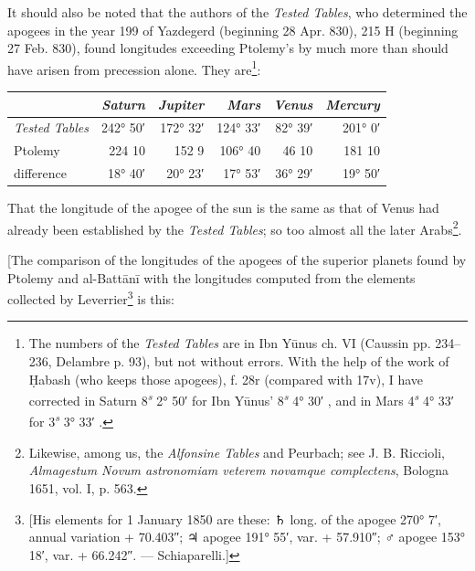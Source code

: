 \documentclass[11pt]{article}
\begin{document}
\par It should also be noted that the authors of the \emph{Tested Tables}, who determined the apogees in the year 199 of Yazdegerd (beginning 28 Apr. 830), 215 H (beginning 27 Feb. 830), found longitudes exceeding Ptolemy's by much more than should have arisen from precession alone. They are\footnote{The numbers of the \emph{Tested Tables} are in Ibn Yūnus ch. VI (Caussin pp. 234–236, Delambre p. 93), but not without errors. With the help of the work of Ḥabash (who keeps those apogees), f. 28r (compared with 17v), I have corrected in Saturn 8\textsuperscript{\itshape s} 2° 50′  for Ibn Yūnus' 8\textsuperscript{\itshape s} 4° 30′ , and in Mars 4\textsuperscript{\itshape s} 4° 33′  for 3\textsuperscript{\itshape s} 3° 33′ .}:\par
\begin{center}\small\begin{tabular}{lrrrrr}
 & \emph{Saturn} & \emph{Jupiter} & \emph{Mars} & \emph{Venus} & \emph{Mercury} \\
\midrule
\emph{Tested Tables} & 242° 50′ & 172° 32′ & 124° 33′ & 82° 39′ & 201° 0′ \\
Ptolemy & 224 10 & 152 9 & 106° 40 & 46 10 & 181 10 \\
\midrule
difference & 18° 40′ & 20° 23′ & 17° 53′ & 36° 29′ & 19° 50′ \\
\end{tabular}\end{center}
\par That the longitude of the apogee of the sun is the same as that of Venus had already been established by the \emph{Tested Tables}; so too almost all the later Arabs\footnote{Likewise, among us, the \emph{Alfonsine Tables} and Peurbach; see J. B. Riccioli, \emph{Almagestum Novum astronomiam veterem novamque complectens}, Bologna 1651, vol. I, p. 563.}.\par
\par [The comparison of the longitudes of the apogees of the superior planets found by Ptolemy and al-Battānī with the longitudes computed from the elements collected by Leverrier\footnote{[His elements for 1 January 1850 are these: {\MoonFont\upshape ♄} long. of the apogee 270° 7′, annual variation + 70.403″; {\MoonFont\upshape ♃} apogee 191° 55′, var. + 57.910″; {\MoonFont\upshape ♂} apogee 153° 18′, var. + 66.242″. — Schiaparelli.]} is this:\par
\end{document}
